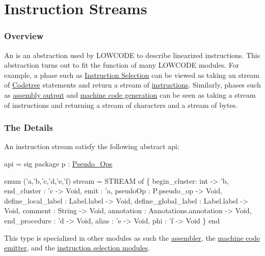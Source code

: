 \section{Instruction Streams}

\subsubsection{Overview}
An 
is an abstraction used by LOWCODE to describe linearized instructions.
This abstraction turns out to fit the function of
many LOWCODE modules.  For example,
a phase such as \href{instrsel.html}{Instruction Selection} 
can be viewed as taking an stream of 
\href{codetree.html}{Codetree} statements and return a
stream of \href{instructions.html}{instructions}.  Similarly,
phases such as \href{asm.html}{assembly output} and
\href{mc.html}{machine code generation} can be seen 
as taking a stream of instructions and 
returning a stream of characters and a stream of bytes.

\subsubsection{The Details}
An instruction stream satisfy the following abstract api:
\begin{SML}
api  =
sig
   package p : \href{pseudo-ops.html}{Pseudo_Ops}

   enum ('a,'b,'c,'d,'e,'f) stream =
      STREAM of
      \{ begin_cluster: int -> 'b,  
        end_cluster  : 'c -> Void, 
        emit        : 'a,        
        pseudoOp    : P.pseudo_op -> Void,
        define_local_label : Label.label -> Void,
        define_global_label  : Label.label -> Void,
        comment     : String -> Void,    
        annotation  : Annotations.annotation -> Void,
        end_procedure   : 'd -> Void,
        alias       : 'e -> Void, 
        phi         : 'f -> Void  
      \}
end
\end{SML}
This type is specialized in other modules as such the
\href{asm.html}{assembler}, the \href{mc.html}{machine code emitter},
and the \href{instrsel.html}{instruction selection modules}.
